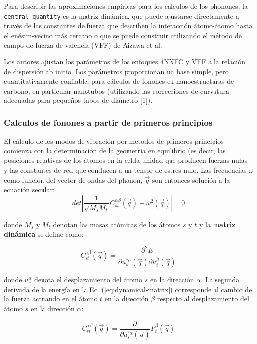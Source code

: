 \documentclass[11pt]{article}
\begin{document}
Para describir las aproximaciones empiricas para los calculos de los phonones, la \texttt{central quantity} es la matriz dinámica, que puede ajustarse directamente a través de las
constantes de fuerza que describen la interacción átomo-átomo hasta el enésim-vecino más cercano o que se puede construir utilizando el método de campo de fuerza de valencia (VFF) de Aizawa et al.

Los autores ajustan los parámetros de los enfoques 4NNFC y VFF a la relación de dispersión ab initio. Los parámetros proporcionan un base simple, pero cuantitativamente confiable, para cálculos de fonones en nanoestructuras de carbono, en particular nanotubos (utilizando las correcciones de curvatura adecuadas para pequeños
tubos de diámetro [1]).

\subsubsection{Calculos de fonones a partir de primeros principios}
\label{sec:orga7347dd}
El cálculo de los modos de vibración por metodos de primeros principios comienza con la determinación de la geometria en equilibrio (es decir, las posiciones relativas de los átomos en la celda unidad que producen fuerzas nulas y las constantes de red que conducen a un tensor de estres nulo. Las frecuencias \(\omega\) como función del vector de ondas del phonon, \(\vec q\) son entonces solución a la ecuación secular:
\begin{equation}
det\left|\frac{1}{\sqrt{M_s M_t}}C^{\alpha\beta}_{s t}(\vec q)-\omega^2(\vec q)\right|=0
\end{equation}

donde \(M_s\) y \(M_t\) denotan las masas atómicas de los átomos \(s\) y \(t\) y la \textbf{matriz dinámica} se define como: 

\begin{equation}\boxed{
C^{\alpha\beta}_{s t}(\vec q)=\frac{\partial^2E}{\partial u^{*\alpha}_s (\vec q)\partial u^\beta_t(\vec q)}}
\label{eq:dynamical-matrix}
\end{equation}

donde \(u^\alpha_s\) denota el desplazamiento del átomo \(s\) en la dirección \(\alpha\). La segunda derivada de la energía en la Ec. (\ref{eq:dynamical-matrix}) corresponde al cambio de la fuerza actuando en el átomo \(t\) en la dirección \(\beta\) respecto al desplazamiento del átomo \(s\) en la dirección \(\alpha\):

\begin{equation}
C^{\alpha\beta}_{s t}(\vec q)=\frac{\partial}{\partial u^{*\alpha}_s (\vec q)}F^\beta_t(\vec q)
\label{eq:dynamical-matrix}
\end{equation}
\end{document}
